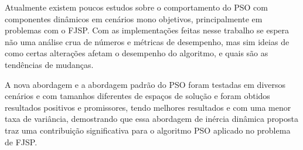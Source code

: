 
Atualmente existem poucos estudos sobre o comportamento do PSO com componentes dinâmicos em cenários mono objetivos, principalmente em problemas com o FJSP. 
%
Com as implementações feitas nesse trabalho se espera não uma análise crua de números e métricas de desempenho, mas sim ideias de como certas alterações afetam o desempenho do algoritmo, e quais são as tendências de mudanças.


A nova abordagem e a abordagem padrão do PSO foram testadas em diversos cenários e com tamanhos diferentes de espaços de solução e foram obtidos resultados positivos e promissores, tendo melhores resultados e com uma menor taxa de variância, demostrando que essa abordagem de inércia dinâmica proposta traz uma contribuição significativa para o algoritmo PSO aplicado no problema de FJSP.
